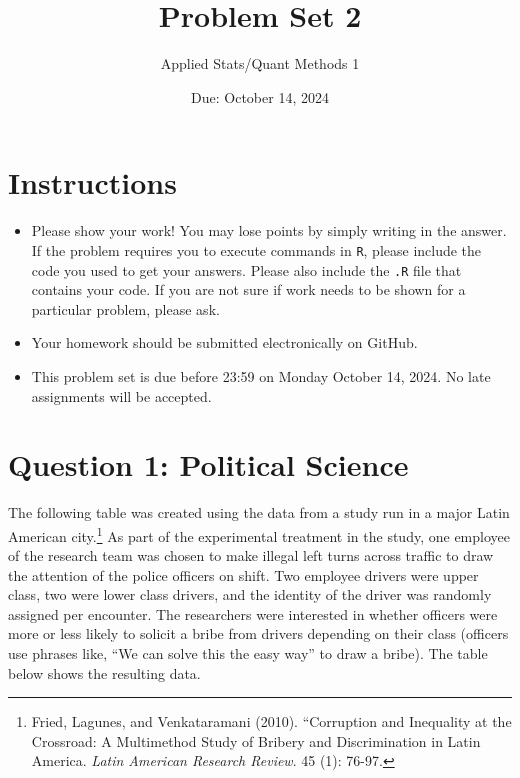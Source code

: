 \documentclass[12pt,letterpaper]{article}
\title{Problem Set 2}
\date{Due: October 14, 2024}
\author{Applied Stats/Quant Methods 1}
\begin{document}
	\maketitle
	\section*{Instructions}
\begin{itemize}
	\item Please show your work! You may lose points by simply writing in the answer. If the problem requires you to execute commands in \texttt{R}, please include the code you used to get your answers. Please also include the \texttt{.R} file that contains your code. If you are not sure if work needs to be shown for a particular problem, please ask.
	\item Your homework should be submitted electronically on GitHub.
	\item This problem set is due before 23:59 on Monday October 14, 2024. No late assignments will be accepted.

\end{itemize}

\vspace{.5cm}
\section*{Question 1: Political Science}
\vspace{.25cm}
	The following table was created using the data from a study run in a major Latin American city.\footnote{Fried, Lagunes, and Venkataramani (2010). ``Corruption and Inequality at the Crossroad: A Multimethod Study of Bribery and Discrimination in Latin America. \textit{Latin American Research Review}. 45 (1): 76-97.} As part of the experimental treatment in the study, one employee of the research team was chosen to make illegal left turns across traffic to draw the attention of the police officers on shift. Two employee drivers were upper class, two were lower class drivers, and the identity of the driver was randomly assigned per encounter. The researchers were interested in whether officers were more or less likely to solicit a bribe from drivers depending on their class (officers use phrases like, ``We can solve this the easy way'' to draw a bribe). The table below shows the resulting data.
\end{document}
